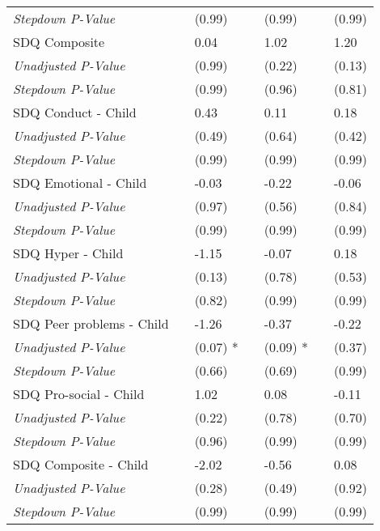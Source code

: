\begin{tabular}{L{9cm} L{1cm} l L{1cm} l l l}
\quad \textit{Stepdown P-Value} & & (0.99)  & & (0.99)  & & (0.99) \\[3pt]
SDQ Composite & & 0.04 & & 1.02  & & 1.20 \\
\quad \textit{Unadjusted P-Value} & & (0.99)  & & (0.22)  & & (0.13) \\
\quad \textit{Stepdown P-Value} & & (0.99)  & & (0.96)  & & (0.81) \\[3pt]
SDQ Conduct - Child & & 0.43 & & 0.11  & & 0.18 \\
\quad \textit{Unadjusted P-Value} & & (0.49)  & & (0.64)  & & (0.42) \\
\quad \textit{Stepdown P-Value} & & (0.99)  & & (0.99)  & & (0.99) \\[3pt]
SDQ Emotional - Child & & -0.03 & & -0.22  & & -0.06 \\
\quad \textit{Unadjusted P-Value} & & (0.97)  & & (0.56)  & & (0.84) \\
\quad \textit{Stepdown P-Value} & & (0.99)  & & (0.99)  & & (0.99) \\[3pt]
SDQ Hyper - Child & & -1.15 & & -0.07  & & 0.18 \\
\quad \textit{Unadjusted P-Value} & & (0.13)  & & (0.78)  & & (0.53) \\
\quad \textit{Stepdown P-Value} & & (0.82)  & & (0.99)  & & (0.99) \\[3pt]
SDQ Peer problems - Child & & -1.26 & & -0.37  & & -0.22 \\
\quad \textit{Unadjusted P-Value} & & (0.07) * & & (0.09) * & & (0.37) \\
\quad \textit{Stepdown P-Value} & & (0.66)  & & (0.69)  & & (0.99) \\[3pt]
SDQ Pro-social - Child & & 1.02 & & 0.08  & & -0.11 \\
\quad \textit{Unadjusted P-Value} & & (0.22)  & & (0.78)  & & (0.70) \\
\quad \textit{Stepdown P-Value} & & (0.96)  & & (0.99)  & & (0.99) \\[3pt]
SDQ Composite - Child & & -2.02 & & -0.56  & & 0.08 \\
\quad \textit{Unadjusted P-Value} & & (0.28)  & & (0.49)  & & (0.92) \\
\quad \textit{Stepdown P-Value} & & (0.99)  & & (0.99)  & & (0.99) \\[3pt]
\bottomrule
\end{tabular}
